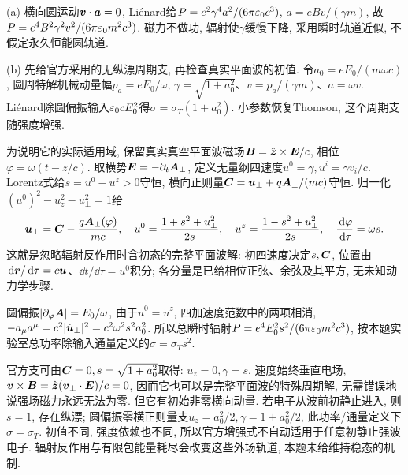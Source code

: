 \begin{solution}
(a) 横向圆运动$\boldsymbol{v}\cdot\boldsymbol{a}=0$, Liénard给$P=e^2\gamma^4a^2/(6\pi\varepsilon_0 c^3)$, $a=eBv/(\gamma m)$, 故$P=e^4B^2\gamma^2v^2/(6\pi\varepsilon_0 m^2c^3)$. 磁力不做功, 辐射使$\gamma$缓慢下降, 采用瞬时轨道近似, 不假定永久恒能圆轨道.

(b) 先给官方采用的无纵漂周期支, 再检查真实平面波的初值. 令$a_0=eE_0/(m\omega c)$, 圆周特解机械动量幅$p_a=eE_0/\omega$, $\gamma=\sqrt{1+a_0^2}$、$v=p_a/(\gamma m)$、$a=\omega v$. Liénard除圆偏振输入$\varepsilon_0 cE_0^2$得$\sigma=\sigma_T(1+a_0^2)$. 小参数恢复Thomson, 这个周期支随强度增强.

为说明它的实际适用域, 保留真实真空平面波磁场$\boldsymbol{B}=\hat{\boldsymbol{z}}\times\boldsymbol{E}/c$, 相位$\varphi=\omega(t-z/c)$. 取横势$\boldsymbol{E}=-\partial_t\boldsymbol{A}_\perp$, 定义无量纲四速度$u^0=\gamma,u^i=\gamma v_i/c$. Lorentz式给$s=u^0-u^z>0$守恒, 横向正则量$\boldsymbol{C}=\boldsymbol{u}_\perp+q\boldsymbol{A}_\perp/(mc)$守恒. 归一化$(u^0)^2-u_z^2-u_\perp^2=1$给
\[
\boldsymbol{u}_\perp=\boldsymbol{C}-\frac{q\boldsymbol{A}_\perp(\varphi)}{mc},\quad
u^0=\frac{1+s^2+u_\perp^2}{2s},\quad
u^z=\frac{1-s^2+u_\perp^2}{2s},\quad
\frac{\,\mathrm d\varphi}{\,\mathrm d\tau}=\omega s.
\]
这就是忽略辐射反作用时含初态的完整平面波解: 初四速度决定$s,\boldsymbol{C}$, 位置由$\,\mathrm d\boldsymbol{r}/\,\mathrm d\tau=c\boldsymbol{u}$、$\dd t/\dd\tau=u^0$积分; 各分量是已给相位正弦、余弦及其平方, 无未知动力学步骤.

圆偏振$|\partial_\varphi\boldsymbol{A}|=E_0/\omega$, 由于$\dot u^0=\dot u^z$, 四加速度范数中的两项相消, $-a_\mu a^\mu=c^2|\dot{\boldsymbol{u}}_\perp|^2=c^2\omega^2s^2a_0^2$. 所以总瞬时辐射$P=e^4E_0^2s^2/(6\pi\varepsilon_0 m^2c^3)$, 按本题实验室总功率除输入通量定义的$\sigma=\sigma_Ts^2$.

官方支可由$\boldsymbol{C}=0,s=\sqrt{1+a_0^2}$取得: $u_z=0,\gamma=s$, 速度始终垂直电场, $\boldsymbol{v}\times\boldsymbol{B}=\hat{\boldsymbol{z}}(\boldsymbol{v}_\perp\cdot\boldsymbol{E})/c=0$, 因而它也可以是完整平面波的特殊周期解, 无需错误地说强场磁力永远无法为零. 但它有初始非零横向动量. 若电子从波前初静止进入, 则$s=1$, 存在纵漂; 圆偏振零横正则量支$u_z=a_0^2/2,\gamma=1+a_0^2/2$, 此功率/通量定义下$\sigma=\sigma_T$. 初值不同, 强度依赖也不同, 所以官方增强式不自动适用于任意初静止强波电子. 辐射反作用与有限包能量耗尽会改变这些外场轨道, 本题未给维持稳态的机制.
\end{solution}
